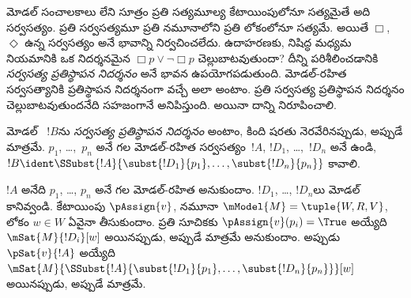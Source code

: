 \documentclass[../../../include/open-logic-section]{subfiles}
\begin{document}


\begin{explain}
  మోడల్ సంచాలకాలు లేని సూత్రం ప్రతి సత్యమూల్య
  కేటాయింపులోనూ సత్యమైతే అది సర్వసత్యం. ప్రతి సర్వసత్యమూ
  ప్రతి నమూనాలోని ప్రతి లోకంలోనూ సత్యమే.
  అయితే $\Box$, $\Diamond$ ఉన్న 
  సర్వసత్యం అనే భావాన్ని నిర్వచించలేదు. ఉదాహరణకు,
  నిషిద్ధ మధ్యమ నియమానికి ఒక నిదర్శనమైన
  $\Box p \lor \lnot \Box p$ చెల్లుబాటవుతుందా?
  దీన్ని పరిశీలించడానికి \emph{సర్వసత్య ప్రతిస్థాపన నిదర్శనం}
  అనే భావన ఉపయోగపడుతుంది. మోడల్-రహిత సర్వసత్యానికి
  ప్రతిస్థాపన నిదర్శనంగా వచ్చే  అలా అంటాం.
  ప్రతి సర్వసత్య ప్రతిస్థాపన నిదర్శనం
  చెల్లుబాటవుతుందనేది సహజంగానే అనిపిస్తుంది. అయినా దాన్ని నిరూపించాలి.
\end{explain}

\begin{defn}
  మోడల్ ~$!B$ను
  \emph{సర్వసత్య ప్రతిస్థాపన నిదర్శనం} అంటాం, కింది షరతు
  నెరవేరినప్పుడు, అప్పుడే మాత్రమే. $p_1$, \dots,~$p_n$ అనే
   గల మోడల్-రహిత సర్వసత్యం~$!A$,
  $!D_1$, \dots,~$!D_n$ అనే  ఉండి,
  $!B \ident \SSubst{!A}{\subst{!D_1}{p_1},
    \dots, \subst{!D_n}{p_n}}$ కావాలి.
\end{defn}

\begin{lem}
  $!A$ అనేది $p_1$, \dots, $p_n$ అనే
   గల మోడల్-రహిత
   అనుకుందాం.
  $!D_1$, \dots, $!D_n$లు మోడల్
   కానివ్వండి.
  కేటాయింపు $\pAssign{v}$, నమూనా $\mModel{M} = \tuple{W, R, V}$,
  లోకం $w \in W$ ఏవైనా తీసుకుందాం. ప్రతి సూచికకు
  $\pAssign{v}(p_i) = \True$ అయ్యేది $\mSat{M}{!D_i}[w]$
  అయినప్పుడు, అప్పుడే మాత్రమే అనుకుందాం. అప్పుడు $\pSat{v}{!A}$ అయ్యేది
  $\mSat{M}{\SSubst{!A}{\subst{!D_1}{p_1}, \dots,
      \subst{!D_n}{p_n}}}[w]$ అయినప్పుడు, అప్పుడే మాత్రమే.
\end{lem}
\end{document}
